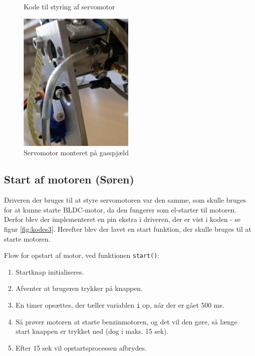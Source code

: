 \begin{figure}[h]
  \centering
  
  \caption{Kode til styring af servomotor}
  \label{fig:kodes2}
\end{figure}

  
\begin{figure}[h]
  \centering
  \includegraphics[width=0.5\textwidth]{./figurer/mots5.png}
  \caption{Servomotor monteret på gasspjæld}
  \label{fig:mots5}
\end{figure}

  
\subsection{Start af motoren (Søren)}
\label{sec:start-af-motoren}

Driveren der bruges til at styre servomotoren var den samme, som skulle bruges for at kunne starte BLDC-motor, da den fungerer som el-starter til motoren. Derfor blev der implementeret en pin ekstra i driveren, der er vist i koden - se figur \ref{fig:kodes3}. Herefter blev der lavet en start funktion, der skulle bruges til at starte motoren.

Flow for opstart af motor, ved funktionen \lstinline{start()}:

\begin{enumerate}
\item Startknap initialiseres.
\item Afventer at brugeren trykker på knappen.
\item En timer opsættes, der tæller variablen \lstinline{i} op, når der er gået 500 ms.
\item Så prøver motoren at starte benzinmotoren, og det vil den gøre, så længe start knappen er trykket ned (dog i maks. 15 sek).
\item Efter 15 sek vil opstartsprocessen afbrydes.
\end{enumerate}


